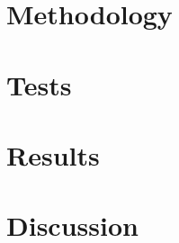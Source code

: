 \documentclass{article}
\begin{document}
\section{Methodology}

\section{Tests}

\section{Results}

\section{Discussion}
\end{document}
